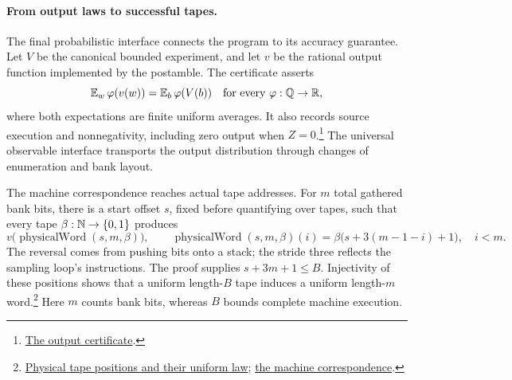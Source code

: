 \paragraph{From output laws to successful tapes.}
The final probabilistic interface connects the program to its accuracy guarantee. Let $V$ be the canonical bounded experiment, and let $v$ be the rational output function implemented by the postamble. The certificate asserts
\[
 \mathbb E_w\,\varphi(v(w))=\mathbb E_b\,\varphi(V(b))
 \quad\text{for every }\varphi:\mathbb Q\to\mathbb R,
\]
where both expectations are finite uniform averages. It also records source execution and nonnegativity, including zero output when $Z=0$.\footnote{\href{https://github.com/openai/math/blob/fd4aeeb2ee4fc729c18d98444fed42fd0529eeeb/lean/OAI/Combinatorics/MatroidCounting/CommonBases.lean\#L25962-L25968}{The output certificate}.} The universal observable interface transports the output distribution through changes of enumeration and bank layout.

The machine correspondence reaches actual tape addresses. For $m$ total gathered bank bits, there is a start offset $s$, fixed before quantifying over tapes, such that every tape $\beta:\mathbb N\to\{0,1\}$ produces
\[
 v\bigl(\operatorname{physicalWord}(s,m,\beta)\bigr),\qquad
 \operatorname{physicalWord}(s,m,\beta)(i)
   =\beta\bigl(s+3(m-1-i)+1\bigr),\quad i<m.
\]
The reversal comes from pushing bits onto a stack; the stride three reflects the sampling loop's instructions. The proof supplies $s+3m+1\leq B$. Injectivity of these positions shows that a uniform length-$B$ tape induces a uniform length-$m$ word.\footnote{\href{https://github.com/openai/math/blob/fd4aeeb2ee4fc729c18d98444fed42fd0529eeeb/lean/OAI/Combinatorics/MatroidCounting/CommonBases.lean\#L25658-L25687}{Physical tape positions and their uniform law}; \href{https://github.com/openai/math/blob/fd4aeeb2ee4fc729c18d98444fed42fd0529eeeb/lean/OAI/Combinatorics/MatroidCounting/CommonBases.lean\#L26027-L26069}{the machine correspondence}.} Here $m$ counts bank bits, whereas $B$ bounds complete machine execution.

